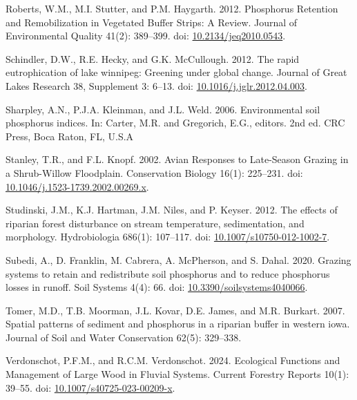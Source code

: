\documentclass[
]{agujournal2019}
\newlength{\cslhangindent}
\newenvironment{CSLReferences}[2] %
 {\begin{list}{}{%
  \setlength{\itemindent}{0pt}
  \setlength{\leftmargin}{0pt}
  \setlength{\parsep}{0pt}
  \ifodd #1
   \setlength{\leftmargin}{\cslhangindent}
   \setlength{\itemindent}{-1\cslhangindent}
  \fi
  \setlength{\itemsep}{#2\baselineskip}}}
 {\end{list}}
\begin{document}
\begin{CSLReferences}{1}{1}
Roberts, W.M., M.I. Stutter, and P.M. Haygarth. 2012. Phosphorus
Retention and Remobilization in Vegetated Buffer Strips: A Review.
Journal of Environmental Quality 41(2): 389--399. doi:
\href{https://doi.org/10.2134/jeq2010.0543}{10.2134/jeq2010.0543}.

Schindler, D.W., R.E. Hecky, and G.K. McCullough. 2012. The rapid
eutrophication of lake winnipeg: Greening under global change. Journal
of Great Lakes Research 38, Supplement 3: 6--13. doi:
\href{https://doi.org/10.1016/j.jglr.2012.04.003}{10.1016/j.jglr.2012.04.003}.

Sharpley, A.N., P.J.A. Kleinman, and J.L. Weld. 2006. Environmental soil
phosphorus indices. In: Carter, M.R. and Gregorich, E.G., editors. 2nd
ed. CRC Press, Boca Raton, FL, U.S.A

Stanley, T.R., and F.L. Knopf. 2002. Avian Responses to Late-Season
Grazing in a Shrub-Willow Floodplain. Conservation Biology 16(1):
225--231. doi:
\href{https://doi.org/10.1046/j.1523-1739.2002.00269.x}{10.1046/j.1523-1739.2002.00269.x}.

Studinski, J.M., K.J. Hartman, J.M. Niles, and P. Keyser. 2012. The
effects of riparian forest disturbance on stream temperature,
sedimentation, and morphology. Hydrobiologia 686(1): 107--117. doi:
\href{https://doi.org/10.1007/s10750-012-1002-7}{10.1007/s10750-012-1002-7}.

Subedi, A., D. Franklin, M. Cabrera, A. McPherson, and S. Dahal. 2020.
Grazing systems to retain and redistribute soil phosphorus and to reduce
phosphorus losses in runoff. Soil Systems 4(4): 66. doi:
\href{https://doi.org/10.3390/soilsystems4040066}{10.3390/soilsystems4040066}.

Tomer, M.D., T.B. Moorman, J.L. Kovar, D.E. James, and M.R. Burkart.
2007. Spatial patterns of sediment and phosphorus in a riparian buffer
in western iowa. Journal of Soil and Water Conservation 62(5): 329--338.

Verdonschot, P.F.M., and R.C.M. Verdonschot. 2024. Ecological Functions
and Management of Large Wood in Fluvial Systems. Current Forestry
Reports 10(1): 39--55. doi:
\href{https://doi.org/10.1007/s40725-023-00209-x}{10.1007/s40725-023-00209-x}.


\end{CSLReferences}
\end{document}
